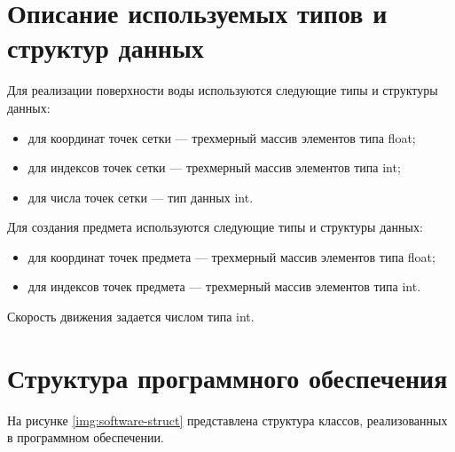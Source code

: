 \section{Описание используемых типов и структур данных}

Для реализации поверхности воды используются следующие типы и структуры данных: 

\begin{itemize}
	\item для координат точек сетки --- трехмерный массив элементов типа float;
	\item для индексов точек сетки --- трехмерный массив элементов типа int;
	\item для числа точек сетки --- тип данных int.
\end{itemize}

Для создания предмета используются следующие типы и структуры данных:

\begin{itemize}
	\item для координат точек предмета --- трехмерный массив элементов типа float;
	\item для индексов точек предмета --- трехмерный массив элементов типа int.
\end{itemize}

Скорость движения задается числом типа int.

\section{Структура программного обеспечения}

На рисунке \ref{img:software-struct} представлена структура классов, реализованных в программном обеспечении.

